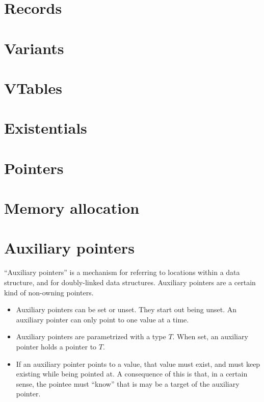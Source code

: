 \documentclass[a4paper]{book}
\begin{document}

\chapter{Records}

\chapter{Variants}
\chapter{VTables}
\chapter{Existentials}

\chapter{Pointers}

\chapter{Memory allocation}


\chapter{Auxiliary pointers}
``Auxiliary pointers'' is a mechanism for referring to locations within
a data structure, and for doubly-linked data structures.
Auxiliary pointers are a certain kind of non-owning pointers.

\begin{itemize}
\item Auxiliary pointers can be set or unset. They start out being unset.
  An auxiliary pointer can only point to one value at a time.
\item Auxiliary pointers are parametrized with a type $T$.
  When set, an auxiliary pointer holds a pointer to $T$.
\item If an auxiliary pointer points to a value, that value must exist,
  and must keep existing while being pointed at.
  A consequence of this is that, in a certain sense, the pointee must ``know''
  that is may be a target of the auxiliary pointer.
\end{itemize}
\end{document}
